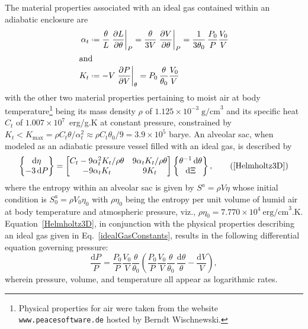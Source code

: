 The material properties associated with an ideal gas contained within an adiabatic enclosure are
\begin{subequations}
    \label{idealGasConstants}
    \begin{align}
\alpha_t & \defeq \frac{\theta}{L} \left. \frac{\partial L}{\partial \theta} \right|_P =
\frac{\theta}{3V} \left. \frac{\partial V}{\partial \theta} \right|_P = 
\frac{1}{3\theta_0} \, \frac{P_0}{P} \frac{V_0}{V} \\
\intertext{and}
K_t & \defeq -V \left. \frac{\partial P}{\partial V} \right|_{\theta} = 
P_0 \, \frac{\theta}{\theta_0} \frac{V_0}{V} 
\label{idealGasK}
\end{align}
\end{subequations}
with the other two material properties pertaining to moist air at body temperature\footnote{
    Physical properties for air were taken from the website \texttt{www.peacesoftware.de} hosted by Berndt Wischnewski.
}
being its mass density $\rho$ of $1.125 \times 10^{-3} \; \text{g/cm}^3$ and its specific heat $C_t$ of $1.007 \times 10^7$~erg/g.K at constant pressure, constrained by $K_t < K_{\max} = \rho C_t \theta / \alpha^2_t \approx \rho C_t \theta_0 / 9 = 3.9 \times 10^5$ barye.  An alveolar sac, when modeled as an adiabatic pressure vessel filled with an ideal gas, is described by
\begin{equation}
\left\{ \begin{matrix}
    \mathrm{d} \eta \\ -3 \, \mathrm{d} P
\end{matrix} \right\} = \begin{bmatrix}
    C_t - 9 \alpha^2_t K_t / \rho \theta & 
    9 \alpha_t K_t / \rho \theta \\
    -9 \alpha_t K_t & 9 K_t
\end{bmatrix} \left\{ \begin{matrix}
    \theta^{-1} \, \mathrm{d} \theta \\ \mathrm{d} \Xi
\end{matrix} \right\},
\tag{\ref{Helmholtz3D}}
\end{equation}
where the entropy within an alveolar sac is given by $S^a = \rho V \eta$ whose initial condition is $S^a_0 = \rho V_0 \eta_0$ with $\rho \eta_0$ being the entropy per unit volume of humid air at body temperature and atmospheric pressure, viz., $\rho \eta_0 = 7.770 \times 10^4 \: \text{erg/cm}^3\text{.K}$.  Equation~\ref{Helmholtz3D}, in conjunction with the physical properties describing an ideal gas given in Eq.~\ref{idealGasConstants}, results in the following differential equation governing pressure:
\begin{displaymath}
\frac{\mathrm{d} P}{P} = \frac{P_0}{P} \frac{V_0}{V} \frac{\theta}{\theta_0} \left( 
\frac{P_0}{P} \frac{V_0}{V} \frac{\theta}{\theta_0} \, 
\frac{\mathrm{d} \theta}{\theta} - 
\frac{\mathrm{d} V}{V} \right),
\end{displaymath}
wherein pressure, volume, and temperature all appear as logarithmic rates.

